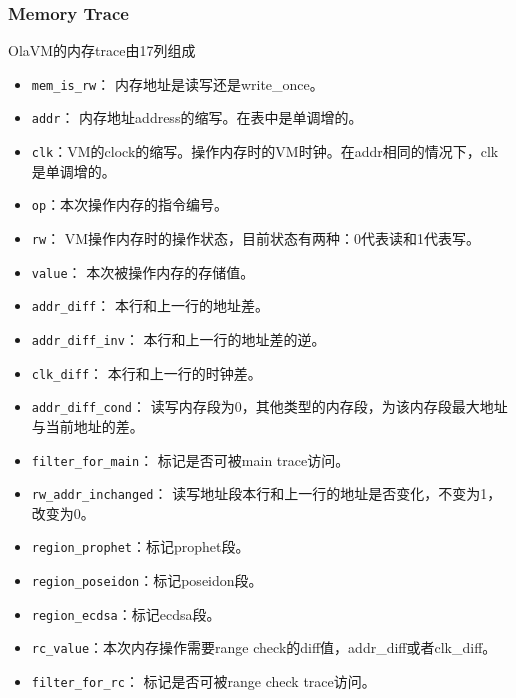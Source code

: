 \subsubsection{Memory Trace}\label{subsubsec: olavm-trace-memory}
OlaVM的内存trace由17列组成
\begin{itemize}
    \item \verb|mem_is_rw|： 内存地址是读写还是write\_once。
    \item \verb|addr|： 内存地址address的缩写。在表中是单调增的。
    \item \verb|clk|：VM的clock的缩写。操作内存时的VM时钟。在addr相同的情况下，clk是单调增的。
    \item \verb|op|：本次操作内存的指令编号。
    \item \verb|rw|： VM操作内存时的操作状态，目前状态有两种：0代表读和1代表写。
    \item \verb|value|： 本次被操作内存的存储值。
    \item \verb|addr_diff|： 本行和上一行的地址差。
    \item \verb|addr_diff_inv|： 本行和上一行的地址差的逆。
    \item \verb|clk_diff|： 本行和上一行的时钟差。
    \item \verb|addr_diff_cond|： 读写内存段为0，其他类型的内存段，为该内存段最大地址与当前地址的差。
    \item \verb|filter_for_main|： 标记是否可被main trace访问。
    \item \verb|rw_addr_inchanged|： 读写地址段本行和上一行的地址是否变化，不变为1，改变为0。
    \item \verb|region_prophet|：标记prophet段。
    \item \verb|region_poseidon|：标记poseidon段。
    \item \verb|region_ecdsa|：标记ecdsa段。
    \item \verb|rc_value|：本次内存操作需要range check的diff值，addr\_diff或者clk\_diff。
    \item \verb|filter_for_rc|： 标记是否可被range check trace访问。
\end{itemize}

